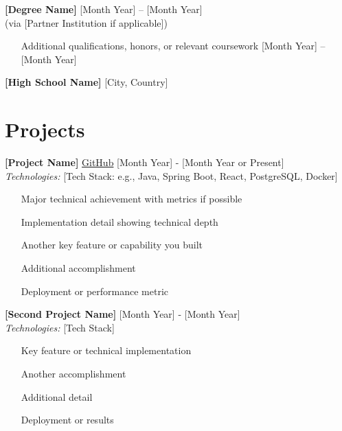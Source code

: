 \documentclass[10pt,letterpaper]{article}
\begin{document}
\textbf{[Degree Name]} \hfill [Month Year] – [Month Year] \\
[University Name] (via [Partner Institution if applicable])
\begin{itemize}[leftmargin=*, label={\color{darkgray}\textbullet}, itemsep=1pt]
    \item [Additional qualifications, honors, or relevant coursework] \hfill [Month Year] – [Month Year]
\end{itemize}

\vspace{0.3cm}

\textbf{[High School Name]} \hfill [City, Country]

\section*{Projects}

\textbf{[Project Name]} \href{https://github.com/yourusername/project}{GitHub} \hfill [Month Year] - [Month Year or Present] \\
\textit{Technologies:} [Tech Stack: e.g., Java, Spring Boot, React, PostgreSQL, Docker]
\begin{itemize}[leftmargin=*,label={\color{darkgray}\textbullet},itemsep=1pt]
    \item [Major technical achievement with metrics if possible]
    \item [Implementation detail showing technical depth]
    \item [Another key feature or capability you built]
    \item [Additional accomplishment]
    \item [Deployment or performance metric]
\end{itemize}

\vspace{0.2cm}

\textbf{[Second Project Name]} \hfill [Month Year] - [Month Year] \\
\textit{Technologies:} [Tech Stack]
\begin{itemize}[leftmargin=*,label={\color{darkgray}\textbullet},itemsep=1pt]
    \item [Key feature or technical implementation]
    \item [Another accomplishment]
    \item [Additional detail]
    \item [Deployment or results]
\end{itemize}
\end{document}
